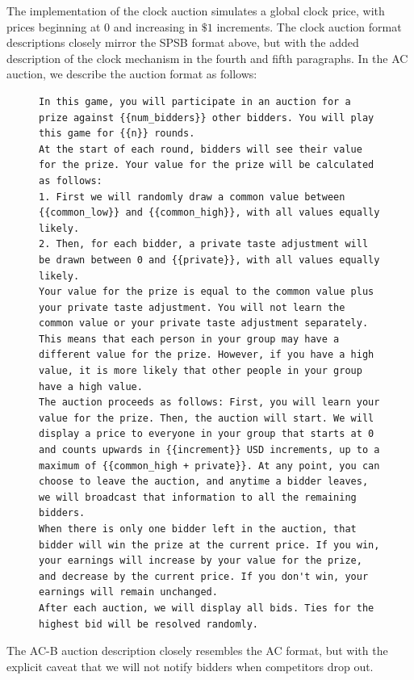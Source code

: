 The implementation of the clock auction simulates a global clock price, with prices beginning at $0$ and increasing in $\$1$ increments. The clock auction format descriptions closely mirror the SPSB format above, but with the added description of the clock mechanism in the fourth and fifth paragraphs. 
In the AC auction, we describe the auction format as follows: 
\begin{figure}
\centering
\begin{minipage}{0.95\textwidth}
\begin{lstlisting}
In this game, you will participate in an auction for a prize against {{num_bidders}} other bidders. You will play this game for {{n}} rounds. 
At the start of each round, bidders will see their value for the prize. Your value for the prize will be calculated as follows:
1. First we will randomly draw a common value between {{common_low}} and {{common_high}}, with all values equally likely.
2. Then, for each bidder, a private taste adjustment will be drawn between 0 and {{private}}, with all values equally likely.
Your value for the prize is equal to the common value plus your private taste adjustment. You will not learn the common value or your private taste adjustment separately. This means that each person in your group may have a different value for the prize. However, if you have a high value, it is more likely that other people in your group have a high value.
The auction proceeds as follows: First, you will learn your value for the prize. Then, the auction will start. We will display a price to everyone in your group that starts at 0 and counts upwards in {{increment}} USD increments, up to a maximum of {{common_high + private}}. At any point, you can choose to leave the auction, and anytime a bidder leaves, we will broadcast that information to all the remaining bidders. 
When there is only one bidder left in the auction, that bidder will win the prize at the current price. If you win, your earnings will increase by your value for the prize, and decrease by the current price. If you don't win, your earnings will remain unchanged.
After each auction, we will display all bids. Ties for the highest bid will be resolved randomly.
\end{lstlisting}
\end{minipage}
\label{fig:sealbid_prompt}
\end{figure}

The AC-B auction description closely resembles the AC format, but with the explicit caveat that we will not notify bidders when competitors drop out.


